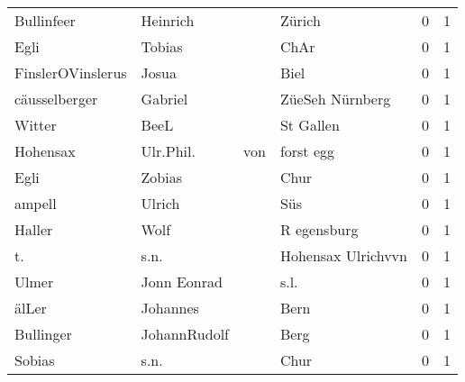 \begin{tabular}{llllrr}
               Bullinfeer &                           Heinrich &             &                                      Zürich &          0 &         1 \\
                     Egli &                             Tobias &             &                                        ChAr &          0 &         1 \\
        FinslerOVinslerus &                              Josua &             &                                        Biel &          0 &         1 \\
            cäusselberger &                            Gabriel &             &                             ZüeSeh Nürnberg &          0 &         1 \\
                   Witter &                               BeeL &             &                                   St Gallen &          0 &         1 \\
                 Hohensax &                          Ulr.Phil. &         von &                                   forst egg &          0 &         1 \\
                     Egli &                             Zobias &             &                                        Chur &          0 &         1 \\
                   ampell &                             Ulrich &             &                                         Süs &          0 &         1 \\
                   Haller &                               Wolf &             &                                 R egensburg &          0 &         1 \\
                       t. &                               s.n. &             &                          Hohensax Ulrichvvn &          0 &         1 \\
                    Ulmer &                        Jonn Eonrad &             &                                        s.l. &          0 &         1 \\
                    älLer &                           Johannes &             &                                        Bern &          0 &         1 \\
                Bullinger &                       JohannRudolf &             &                                        Berg &          0 &         1 \\
                   Sobias &                               s.n. &             &                                        Chur &          0 &         1 \\

\end{tabular}
